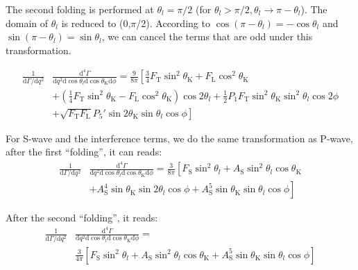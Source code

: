 The second folding is performed at $\theta_l = \pi/2$ (for $\theta_l>\pi/2,\theta_l\rightarrow \pi- \theta_l$).
The domain of $\theta_l$ is reduced to (0,$\pi$/2).
According to $\cos(\pi-\theta_l) = -\cos\theta_l$ and $\sin(\pi-\theta_l) = \sin\theta_l$, we can cancel the terms that are odd under this transformation.

\begin{equation} \label{eq:fold2}
  \begin{split}
    \frac{1}{\mathrm{d}\Gamma/\mathrm{d}q^2}&\frac{\mathrm{d}^4\Gamma}{\mathrm{d}q^2 \mathrm{d}\cos\theta_l \mathrm{d}\cos\theta_\mathrm{K} \mathrm{d}\phi} = \frac{9}{8\pi}\left[\frac{3}{4}F_\mathrm{T}\sin^2\theta_\mathrm{K} + F_\mathrm{L}\cos^2\theta_\mathrm{K} \right.\\
      &\left.+(\frac{1}{4}F_\mathrm{T}\sin^2\theta_\mathrm{K}-F_\mathrm{L}\cos^2\theta_\mathrm{K})\cos2\theta_l+\frac{1}{2}P_1F_\mathrm{T}\sin^2\theta_\mathrm{K}\sin^2\theta_l\cos 2\phi \right.\\
      &\left.+\sqrt{F_\mathrm{T}F_\mathrm{L}}P_5'\sin2\theta_\mathrm{K}\sin\theta_l\cos\phi  \right]
  \end{split}
\end{equation}

For S-wave and the interference terms, we do the same transformation as P-wave, after the first ``folding'', it can reads:
\begin{equation} \label{eq:S-fold1}
  \begin{split}
    \frac{1}{\mathrm{d}\Gamma/\mathrm{d}q^2}&\frac{\mathrm{d}^4\Gamma}{\mathrm{d}q^2 \mathrm{d}\cos\theta_l \mathrm{d}\cos\theta_\mathrm{K} \mathrm{d}\phi} = \frac{3}{8\pi}\left[F_\mathrm{S}\sin^2\theta_l+ A_\mathrm{S}\sin^2\theta_l\cos\theta_\mathrm{K}\right.\\
      &+\left. A_\mathrm{S}^4\sin\theta_\mathrm{K}\sin2\theta_l\cos\phi + A^5_\mathrm{S}\sin\theta_\mathrm{K}\sin\theta_l\cos\phi\right]
  \end{split}
\end{equation}

After the second ``folding'', it reads:
\begin{equation} \label{eq:S-fold2}
  \begin{split}
    \frac{1}{\mathrm{d}\Gamma/\mathrm{d}q^2}&\frac{\mathrm{d}^4\Gamma}{\mathrm{d}q^2 \mathrm{d}\cos\theta_l \mathrm{d}\cos\theta_\mathrm{K} \mathrm{d}\phi} = \\
    &\frac{3}{4\pi}\left[F_\mathrm{S}\sin^2\theta_l+A_\mathrm{S}\sin^2\theta_l\cos\theta_\mathrm{K}+A^5_\mathrm{S}\sin\theta_\mathrm{K}\sin\theta_l\cos\phi\right]
  \end{split}
\end{equation}

